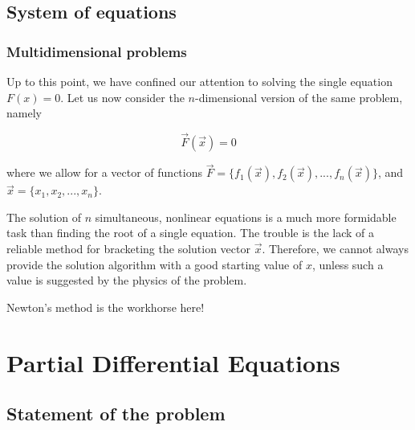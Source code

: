 \documentclass[hyperref={colorlinks=true}]{beamer}
\begin{document}
\subsection[System of equations]{System of equations}

\begin{frame}%
  \frametitle{Multidimensional problems}

  Up to this point, we have confined our attention to solving the single equation $F(x) = 0$. Let us now consider the $n$-dimensional version of the same problem, namely
  
  \begin{equation}
    \vec{F}(\vec{x}) = 0
  \end{equation}

  where we allow for a vector of functions $\vec{F} = \{f_1(\vec{x}), f_2(\vec{x}), ..., f_n(\vec{x})\}$, and $\vec{x} = \{ x_1, x_2, ..., x_{n} \}$.
  
  \mysp
  
  The solution of $n$ simultaneous, nonlinear equations is a much more formidable task than finding the root of a single equation. The trouble is the lack of a reliable method for bracketing the solution vector $\vec{x}$. Therefore, we cannot always provide the solution algorithm with a good starting value of $x$, unless such a value is suggested by the physics of the problem.
  
  \mysp
  
  Newton's method is the workhorse here!
  

\end{frame}


\section[Partial Differential Equations]{Partial Differential Equations}

\subsection[Statement of the problem]{Statement of the problem}
\end{document}
